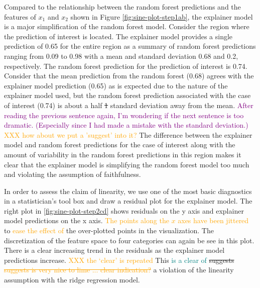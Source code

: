 \documentclass[AMS,STIX2COL]{WileyNJD-v2}\usepackage[]{graphicx}\usepackage[]{color}
\newcommand{\hh}[1]{\textcolor{orange}{#1}}
\newcommand{\kgc}[1]{\textcolor{purple}{#1}}
\newcommand{\kge}[1]{\textcolor{teal}{#1}}
\begin{document}
{Compared to the relationship between the random forest predictions and the features of $x_1$ and $x_2$ shown in Figure \ref{fig:sine-plot-step1ab}, the explainer model is a major simplification of the random forest model. Consider the region where the prediction of interest is located. The explainer model provides a single prediction of 0.65 for the entire region as a summary of random forest predictions ranging from 0.09 to 0.98 with a mean and standard deviation 0.68 and 0.2, respectively. The random forest prediction for the prediction of interest is 0.74. Consider that the mean prediction from the random forest (0.68) agrees with the explainer model prediction (0.65) as is expected due to the nature of the explainer model used, but the random forest prediction associated with the case of interest (0.74) is about a half \sout{1} standard deviation away from the mean. \kgc{After reading the previous sentence again, I'm wondering if the next sentence is too dramatic. (Especially since I had made a mistake with the standard deviation.)} \hh{XXX how about we put a 'suggest' into it?} The difference between the explainer model and random forest predictions for the case of interest along with the amount of variability in the random forest predictions in this region makes it clear that the explainer model is simplifying the random forest model too much and violating the assumption of faithfulness. 


In order to assess the claim of linearity, we use one of the most basic diagnostics in a statistician's tool box and draw a residual plot for the explainer model. The right plot in \autoref{fig:sine-plot-step2cd} shows residuals on the y axis and explainer model predictions on the x axis. \hh{The points along the $x$ axes have been jittered} to \hh{ease the effect of} the over-plotted points in the visualization. The discretization of the feature space to four categories can again be see in this plot. There is a clear increasing trend in the residuals as the explainer model predictions increase. \hh{XXX the `clear' is repeated} This \kge{is a clear of} \sout{suggests} \hh{\sout{suggests is very nice to lime ... clear indication?}} a violation of the linearity assumption with the ridge regression model. 

}
\end{document}

